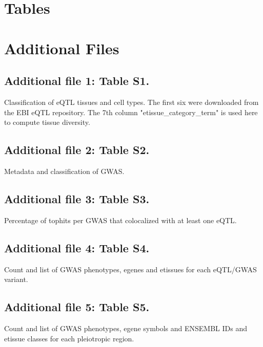 \begin{backmatter}

    \section*{Tables}

    


    \section*{Additional Files}
    \subsection*{Additional file 1: Table S1.}
    Classification of eQTL tissues and cell types. The first six were downloaded from the EBI eQTL repository.
    The 7th column "etissue\_category\_term" is used here to compute tissue diversity.

    \subsection*{Additional file 2: Table S2.}
    Metadata and classification of GWAS.

    \subsection*{Additional file 3: Table S3.}
    Percentage of tophits per GWAS that colocalized with at least one eQTL.

    \subsection*{Additional file 4: Table S4.}
    Count and list of GWAS phenotypes, egenes and etissues for each eQTL/GWAS variant.

    \subsection*{Additional file 5: Table S5.}
    Count and list of GWAS phenotypes, egene symbols and ENSEMBL IDs and etissue classes for each pleiotropic region.

\end{backmatter}
